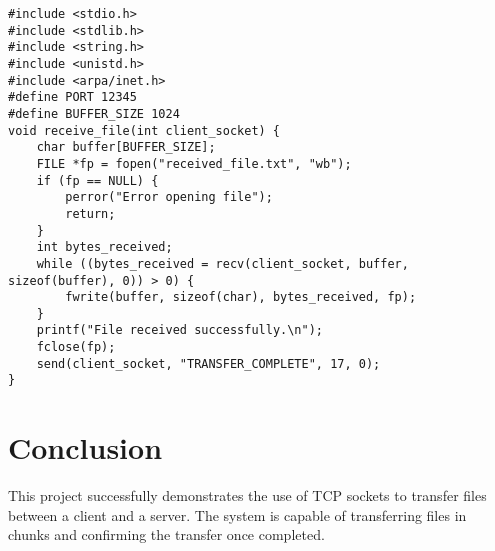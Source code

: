 \documentclass{article}
\begin{document}
\begin{verbatim}
#include <stdio.h>
#include <stdlib.h>
#include <string.h>
#include <unistd.h>
#include <arpa/inet.h>
#define PORT 12345
#define BUFFER_SIZE 1024
void receive_file(int client_socket) {
    char buffer[BUFFER_SIZE];
    FILE *fp = fopen("received_file.txt", "wb");
    if (fp == NULL) {
        perror("Error opening file");
        return;
    }
    int bytes_received;
    while ((bytes_received = recv(client_socket, buffer, sizeof(buffer), 0)) > 0) {
        fwrite(buffer, sizeof(char), bytes_received, fp);
    }
    printf("File received successfully.\n");
    fclose(fp);
    send(client_socket, "TRANSFER_COMPLETE", 17, 0);
}
\end{verbatim}

\section{Conclusion}
This project successfully demonstrates the use of TCP sockets to transfer files between a client and a server. The system is capable of transferring files in chunks and confirming the transfer once completed.
\end{document}
